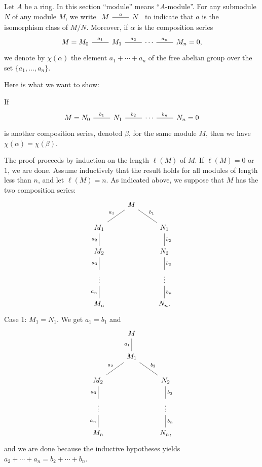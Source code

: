 \documentclass[parskip=half,fontsize=12pt]{scrartcl}%
\begin{document}
Let $A$ be a ring. In this section ``module'' means ``$A$-module''. For any submodule $N$ of any module $M$, we write $\begin{tikzcd}M\ar[r,dash,"a"]&N\end{tikzcd}$ to indicate that $a$ is the isomorphism class of $M/N$. Moreover, if $\alpha$ is the composition series 
$$%
\begin{tikzcd}
M=M_0\ar[r,dash,"a_1"]&M_1\ar[r,dash,"a_2"]&\cdots\ar[r,dash,"a_n"]&M_n=0,
\end{tikzcd}
$$%
we denote by $\chi(\alpha)$ the element $a_1+\cdots+a_n$ of the free abelian group over the set $\{a_1,\dots,a_n\}$. 

Here is what we want to show: 

If 
$$%
\begin{tikzcd}
M=N_0\ar[r,dash,"b_1"]&N_1\ar[r,dash,"b_2"]&\cdots\ar[r,dash,"b_n"]&N_n=0
\end{tikzcd}
$$%
is another composition series, denoted $\beta$, for the same module $M$, then we have $\chi(\alpha)=\chi(\beta)$. 

The proof proceeds by induction on the length $\ell(M)$ of $M$. If $\ell(M)=0$ or $1$, we are done. Assume inductively that the result holds for all modules of length less than $n$, and let $\ell(M)=n$. As indicated above, we suppose that $M$ has the two composition series: %
$$
\begin{tikzcd}
&M\ar[dl,dash,"a_1"']\ar[dr,dash,"b_1"]\\ 
M_1\ar[d,dash,"a_2"']&&N_1\ar[d,dash,"b_2"]\\ 
M_2\ar[d,dash,"a_3"']&&N_2\ar[d,dash,"b_3"]\\ 
\vdots\ar[d,dash,"a_n"']&&\vdots\ar[d,dash,"b_n"]\\ 
M_n&&N_n.
\end{tikzcd}
$$ 
Case 1: $M_1=N_1$. We get $a_1=b_1$ and 
$$
\begin{tikzcd}
&M\ar[d,dash,"a_1"']\\ 
&M_1\ar[dl,dash,"a_2"']\ar[dr,dash,"b_2"]\\ 
M_2\ar[d,dash,"a_3"']&&N_2\ar[d,dash,"b_3"]\\ 
\vdots\ar[d,dash,"a_n"']&&\vdots\ar[d,dash,"b_n"]\\ 
M_n&&N_n,
\end{tikzcd}
$$ 
and we are done because the inductive hypotheses yields $a_2+\cdots+a_n=b_2+\cdots+b_n$.
\end{document}
